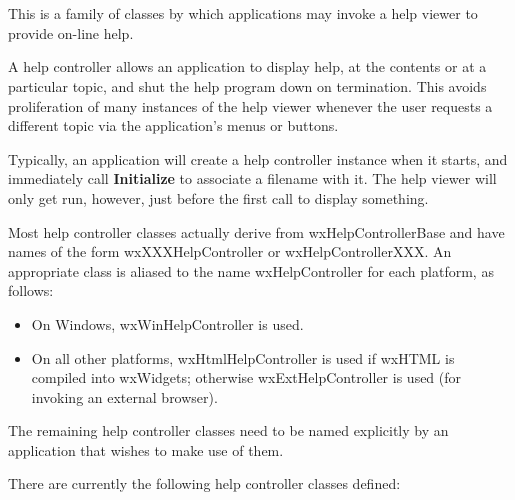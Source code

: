 \section{}\label{wxhelpcontroller}

This is a family of classes by which
applications may invoke a help viewer to provide on-line help.

A help controller allows an application to display help, at the contents
or at a particular topic, and shut the help program down on termination.
This avoids proliferation of many instances of the help viewer whenever the
user requests a different topic via the application's menus or buttons.

Typically, an application will create a help controller instance
when it starts, and immediately call {\bf Initialize}\rtfsp
to associate a filename with it. The help viewer will only get run, however,
just before the first call to display something.

Most help controller classes actually derive from wxHelpControllerBase and have
names of the form wxXXXHelpController or wxHelpControllerXXX. An
appropriate class is aliased to the name wxHelpController for each platform, as follows:

\begin{itemize}\itemsep=0pt
\item On Windows, wxWinHelpController is used.
\item On all other platforms, wxHtmlHelpController is used if wxHTML is
compiled into wxWidgets; otherwise wxExtHelpController is used (for invoking an external
browser).
\end{itemize}

The remaining help controller classes need to be named
explicitly by an application that wishes to make use of them.

There are currently the following help controller classes defined:

